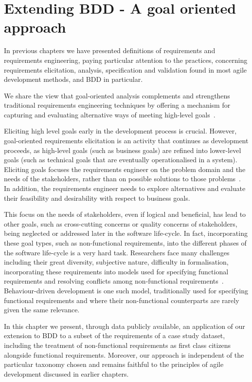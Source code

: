 \documentclass[dissertation,final]{softeng}
\newcommand{\nfrs}{non-functional requirements\xspace}
\begin{document}
\chapter{Extending BDD - A goal oriented approach}
\label{ch:Extendingbdd}
In previous chapters we have presented definitions of requirements and requirements engineering, paying particular attention to the practices, concerning requirements elicitation, analysis, specification and validation found in most agile development methods, and BDD in particular.

We share the view that goal-oriented analysis complements and strengthens traditional requirements engineering techniques by offering a mechanism for capturing and evaluating alternative ways of meeting high-level goals~\citep{MylopoulosExpl2001}.

Eliciting high level goals early in the development process is crucial. However, goal-oriented requirements elicitation is an activity that continues as development proceeds, as high-level goals (such as business goals) are refined into lower-level goals (such as technical goals that are eventually operationalised in a system). Eliciting goals focuses the requirements engineer on the problem domain and the needs of the stakeholders, rather than on possible solutions to those problems~\citep{Nuseibeh:2000ub}. In addition, the requirements engineer needs to explore alternatives and evaluate their feasibility and desirability with respect to business goals.

This focus on the needs of stakeholders, even if logical and beneficial, has lead to other goals, such as cross-cutting concerns or quality concerns of stakeholders, being neglected or addressed later in the software life-cycle. In fact, incorporating these goal types, such as \nfrs, into the different phases of the software life-cycle is a very hard task. Researchers face many challenges including their great diversity,  subjective nature, difficulty in formalisation, incorporating these requirements into models used for specifying functional requirements and resolving conflicts among \nfrs~\citep{Matoussi:2008wr}. Behaviour-driven development is one such model, traditionally used for specifying functional requirements and where their non-functional counterparts are rarely given the same relevance. 

In this chapter we present, through data publicly available, an application of our extension to BDD to a subset of the requirements of a case study dataset, including the treatment of \nfrs as first class citizens alongside functional requirements. Moreover, our approach is independent of the particular taxonomy chosen and remains faithful to the principles of agile development discussed in earlier chapters. 
\end{document}
